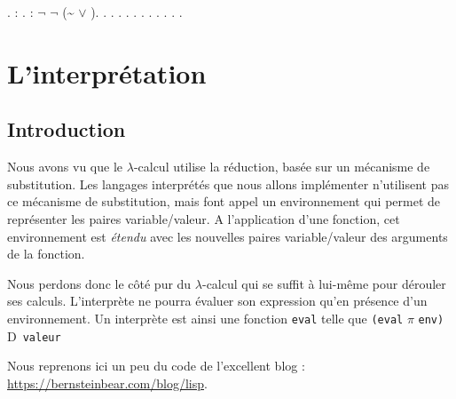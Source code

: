 \documentclass[11pt]{book}
\newcommand{\imp}{{\letterimp D}\hspace{0.1cm}}
\begin{document}
\begin{coqdoccode}
\coqdocnoindent
{} .\coqdoceol
\coqdocnoindent
{}  : .\coqdoceol
\coqdocemptyline
\coqdocnoindent
{} : \ensuremath{\lnot} \ensuremath{\lnot} (\~{} \ensuremath{\lor} ).\coqdoceol
\coqdocnoindent
{}.\coqdoceol
\coqdocindent{1.00em}
 .\coqdoceol
\coqdocindent{1.00em}
 .\coqdoceol
\coqdocindent{1.00em}
 .\coqdoceol
\coqdocindent{1.00em}
.\coqdoceol
\coqdocindent{1.00em}
 .\coqdoceol
\coqdocemptyline
\coqdocindent{1.00em}
 .\coqdoceol
\coqdocindent{1.00em}
.\coqdoceol
\coqdocindent{1.00em}
.\coqdoceol
\coqdocnoindent
{}.\coqdoceol
\coqdocemptyline
\coqdocnoindent
{} .\coqdoceol
\end{coqdoccode}
\chapter{L'interprétation}

\section{Introduction}
Nous avons vu que le $\lambda$-calcul utilise la réduction, basée sur un mécanisme de substitution.
Les langages interprétés que nous allons implémenter n'utilisent pas ce mécanisme de substitution, mais
font appel un environnement qui permet de représenter les paires variable/valeur.
A l'application d'une fonction, cet environnement est \textit{étendu} avec les nouvelles paires variable/valeur
des arguments de la fonction.

Nous perdons donc le côté  pur du $\lambda$-calcul qui se suffit à lui-même pour
dérouler ses calculs.
L'interprète ne pourra évaluer son expression qu'en présence d'un environnement.
Un interprète est ainsi  une fonction \verb+eval+ telle que \verb+(eval+ $\pi$ \verb+env)+ \imp\  \verb+valeur+

Nous reprenons ici  un peu du code de l'excellent blog :
\url{https://bernsteinbear.com/blog/lisp}.
\end{document}
